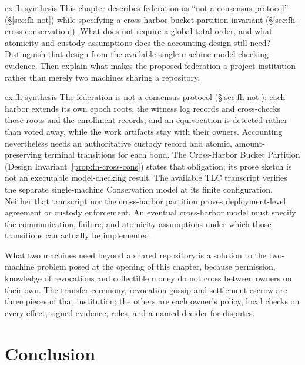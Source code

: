 \documentclass[11pt,a4paper]{article}
\theoremstyle{definition}
\theoremstyle{remark}
\begin{document}
\begin{pdexercise}[kind=Open,rating=3]{ex:fh-synthesis}
This chapter describes federation as ``not a consensus protocol'' (\S\ref{sec:fh-not}) while specifying a cross-harbor bucket-partition invariant (\S\ref{sec:fh-cross-conservation}). What does not require a global total order, and what atomicity and custody assumptions does the accounting design still need? Distinguish that design from the available single-machine model-checking evidence. Then explain what makes the proposed federation a project institution rather than merely two machines sharing a repository.
\end{pdexercise}
\begin{pdsolution}{ex:fh-synthesis}
The federation is not a consensus protocol (\S\ref{sec:fh-not}): each harbor extends its own epoch roots, the witness log records and cross-checks those roots and the enrollment records, and an equivocation is detected rather than voted away, while the work artifacts stay with their owners. Accounting nevertheless needs an authoritative custody record and atomic, amount-preserving terminal transitions for each bond. The Cross-Harbor Bucket Partition (Design Invariant~\ref{prop:fh-cross-cons}) states that obligation; its prose sketch is not an executable model-checking result. The available TLC transcript verifies the separate single-machine Conservation model at its finite configuration. Neither that transcript nor the cross-harbor partition proves deployment-level agreement or custody enforcement. An eventual cross-harbor model must specify the communication, failure, and atomicity assumptions under which those transitions can actually be implemented.

What two machines need beyond a shared repository is a solution to the two-machine problem posed at the opening of this chapter, because permission, knowledge of revocations and collectible money do not cross between owners on their own. The transfer ceremony, revocation gossip and settlement escrow are three pieces of that institution; the others are each owner's policy, local checks on every effect, signed evidence, roles, and a named decider for disputes.
\end{pdsolution}

\ifpdbook
\fi
\section{Conclusion}\label{sec:fh-conclusion}
\end{document}
